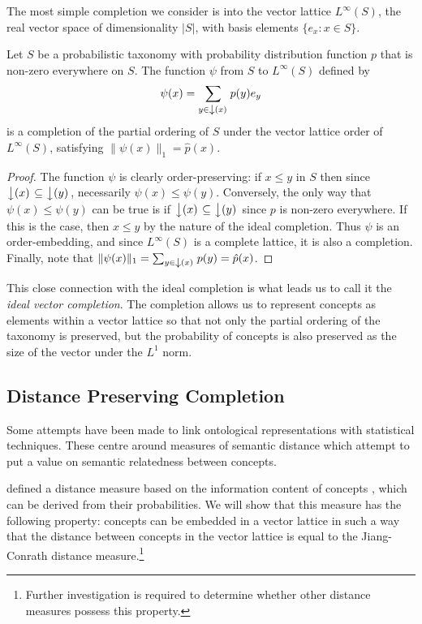 The most simple completion we consider is into the vector lattice $L^\infty(S)$, the real vector space of dimensionality $|S|$, with basis elements $\{e_x : x\in S\}$.
\begin{prop}
Let $S$ be a probabilistic taxonomy with probability distribution function $p$ that is non-zero everywhere on $S$. The function $\psi$ from $S$ to $L^\infty(S)$ defined by
$$\psi(x) = \sum_{y \in \left\downarrow(x)\right.} p(y)e_y$$
is a completion of the partial ordering of $S$ under the vector lattice order of $L^\infty(S)$, satisfying $\|\psi(x)\|_1 = \hat{p}(x)$.
\end{prop}
\begin{proof}
The function $\psi$ is clearly order-preserving: if $x \le y$ in $S$ then since $\left\downarrow(x)\right. \subseteq \left\downarrow(y)\right.$, necessarily $\psi(x) \le \psi(y)$. Conversely, the only way that $\psi(x) \le \psi(y)$ can be true is if $\left\downarrow(x)\right. \subseteq \left\downarrow(y)\right.$ since $p$ is non-zero everywhere. If this is the case, then $x \le y$ by the nature of the ideal completion. Thus $\psi$ is an order-embedding, and since $L^\infty(S)$ is a complete lattice, it is also a completion. Finally, note that $\|\psi(x)\|_1 = \sum_{y\in\left\downarrow(x)\right.} p(y) = \hat{p}(x)$.
\end{proof}
This close connection with the ideal completion is what leads us to call it the \emph{ideal vector completion}. The completion allows us to represent concepts as elements within a vector lattice so that not only the partial ordering of the taxonomy is preserved, but the probability of concepts is also preserved as the size of the vector under the $L^1$ norm.


\subsection{Distance Preserving Completion}
\label{distance-section}

Some attempts have been made to link ontological representations with statistical techniques. These centre around measures of semantic distance which attempt to put a value on semantic relatedness between concepts.

\cite{Jiang:97} defined a distance measure 
based on the information content of concepts \citep{Resnik:95}, which can be derived from their probabilities. We will show that this measure has the following property: concepts can be embedded in a vector lattice in such a way that the distance between concepts in the vector lattice is equal to the Jiang-Conrath distance measure.\footnote{Further investigation is required to determine whether other distance measures possess this property.}

